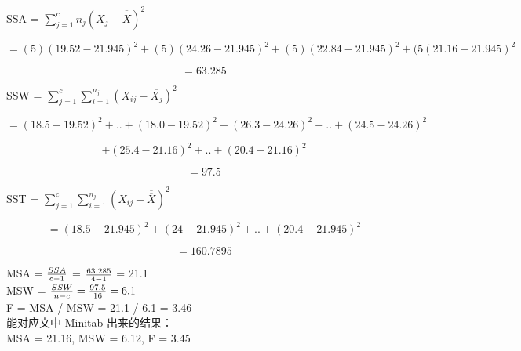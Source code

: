 SSA = \(\sum_{j=1}^c n_j(\overline{X_j} - \overline{\overline{X}})^2\)

\[= (5)(19.52 - 21.945)^2 + (5)(24.26 - 21.945)^2 + (5)(22.84 - 21.945)^2 + (5(21.16 - 21.945)^2\]

\[= 63.285\]

SSW = \(\sum_{j=1}^c \sum_{i=1}^{n_j} (X_{ij} - \overline{X_j})^2\)

\[=(18.5 - 19.52)^2 + . . + (18.0 - 19.52)^2 + (26.3 - 24.26)^2 + . . + (24.5 - 24.26)^2\]

\[+(25.4 - 21.16)^2 + . . + (20.4 - 21.16)^2\]

\[= 97.5\]

SST =
\(\sum_{j=1}^c \sum_{i=1}^{n_j} (X_{ij} - \overline{\overline{X}})^2\)

\[= (18.5 - 21.945)^2 + (24 - 21.945)^2 + ..+ (20.4 - 21.945)^2\]

\[= 160.7895\]

MSA = \({SSA \over c-1}\) = \({63.285 \over 4-1}\) = 21.1\\
MSW = \({SSW \over n -c} = {97.5 \over 16}= 6.1\)\\
F = MSA / MSW = 21.1 / 6.1 = 3.46\\
能对应文中 Minitab 出来的结果：\\
MSA = 21.16, MSW = 6.12, F = 3.45\\

